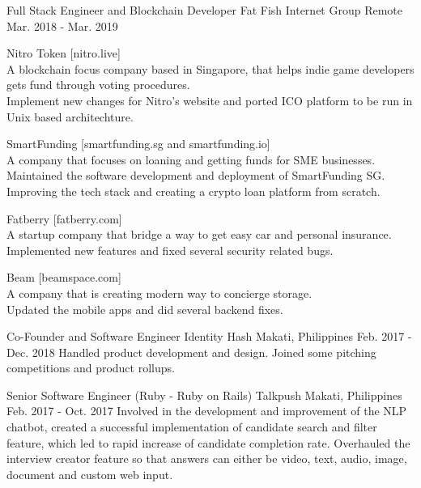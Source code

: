 \begin{cventries}
    \cventry
        {Full Stack Engineer and Blockchain Developer}
        {Fat Fish Internet Group}
        {Remote}
        {Mar. 2018 - Mar. 2019}
        {
            \begin{cvitems}
                \item
                    {Nitro Token [nitro.live]\\
                    A blockchain focus company based in Singapore, that helps indie game developers gets fund through voting procedures.\\
                    Implement new changes for Nitro's website and ported ICO platform to be run in Unix based architechture.}
                \item
                    {SmartFunding [smartfunding.sg and smartfunding.io]\\
                    A company that focuses on loaning and getting funds for SME businesses.\\
                    Maintained the software development and deployment of SmartFunding SG. Improving the tech stack and creating a crypto loan platform from scratch.}
                \item
                    {Fatberry [fatberry.com]\\
                    A startup company that bridge a way to get easy car and personal insurance.\\
                    Implemented new features and fixed several security related bugs.}
                \item
                    {Beam [beamspace.com]\\
                    A company that is creating modern way to concierge storage.\\
                    Updated the mobile apps and did several backend fixes.}
            \end{cvitems}
        }

    \cventry
        {Co-Founder and Software Engineer}
        {Identity Hash}
        {Makati, Philippines}
        {Feb. 2017 - Dec. 2018}
        {Handled product development and design. Joined some pitching competitions and product rollups.}
        
    \cventry
        {Senior Software Engineer (Ruby - Ruby on Rails)}
        {Talkpush}
        {Makati, Philippines}
        {Feb. 2017 - Oct. 2017}
        {Involved in the development and improvement of the NLP chatbot, created a successful implementation of candidate search and filter feature, which led to rapid increase of candidate completion rate. Overhauled the interview creator feature so that answers can either be video, text, audio, image, document and custom web input.}
    

\end{cventries}
